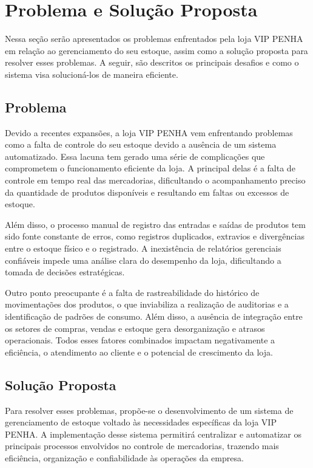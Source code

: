 \documentclass[
	12pt,				%
	openany,			%
	twoside,			%
	a4paper,			%
	english,			%
	brazil				%
	]{abntex2}
\begin{document}
\section{Problema e Solução Proposta}

Nessa seção serão apresentados os problemas enfrentados pela loja VIP PENHA em relação ao gerenciamento do seu estoque, assim como a solução proposta para resolver esses problemas. A seguir, são descritos os principais desafios e como o sistema visa solucioná-los de maneira eficiente.

\subsection{Problema}

Devido a recentes expansões, a loja VIP PENHA vem enfrentando problemas como a falta de controle do seu estoque devido a ausência de um sistema automatizado. Essa lacuna tem gerado uma série de complicações que comprometem o funcionamento eficiente da loja. A principal delas é a falta de controle em tempo real das mercadorias, dificultando o acompanhamento preciso da quantidade de produtos disponíveis e resultando em faltas ou excessos de estoque.

Além disso, o processo manual de registro das entradas e saídas de produtos tem sido fonte constante de erros, como registros duplicados, extravios e divergências entre o estoque físico e o registrado. A inexistência de relatórios gerenciais confiáveis impede uma análise clara do desempenho da loja, dificultando a tomada de decisões estratégicas.

Outro ponto preocupante é a falta de rastreabilidade do histórico de movimentações dos produtos, o que inviabiliza a realização de auditorias e a identificação de padrões de consumo. Além disso, a ausência de integração entre os setores de compras, vendas e estoque gera desorganização e atrasos operacionais. Todos esses fatores combinados impactam negativamente a eficiência, o atendimento ao cliente e o potencial de crescimento da loja.


\subsection{Solução Proposta}

Para resolver esses problemas, propõe-se o desenvolvimento de um sistema de gerenciamento de estoque voltado às necessidades específicas da loja VIP PENHA. A implementação desse sistema permitirá centralizar e automatizar os principais processos envolvidos no controle de mercadorias, trazendo mais eficiência, organização e confiabilidade às operações da empresa.
\end{document}
